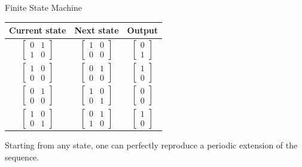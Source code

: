 \documentclass{beamer}
\begin{document}
	\begin{frame}{Finite State Machine}
		\begin{example}
			\justifying
			\begin{table}
				\centering
				\begin{tabular}{c c c}
					\toprule
					Current state & Next state & Output \\
					\midrule
					$\begin{bmatrix} 0 & 1 \\ 1 & 0 \end{bmatrix}$ & $\begin{bmatrix} 1 & 0 \\ 0 & 0 \end{bmatrix}$ & $\begin{bmatrix} 0 \\ 1 \end{bmatrix}$ \\
					$\begin{bmatrix} 1 & 0 \\ 0 & 0 \end{bmatrix}$ & $\begin{bmatrix} 0 & 1 \\ 0 & 0 \end{bmatrix}$ & $\begin{bmatrix} 1 \\ 0 \end{bmatrix}$ \\
					$\begin{bmatrix} 0 & 1 \\ 0 & 0 \end{bmatrix}$ & $\begin{bmatrix} 1 & 0 \\ 0 & 1 \end{bmatrix}$ & $\begin{bmatrix} 0 \\ 0 \end{bmatrix}$ \\
					$\begin{bmatrix} 1 & 0 \\ 0 & 1 \end{bmatrix}$ & $\begin{bmatrix} 0 & 1 \\ 1 & 0 \end{bmatrix}$ & $\begin{bmatrix} 1 \\ 0 \end{bmatrix}$ \\
					\bottomrule
				\end{tabular}
			\end{table}

			Starting from any state, one can perfectly reproduce a periodic extension of the sequence.
		\end{example}
	\end{frame}
\end{document}
